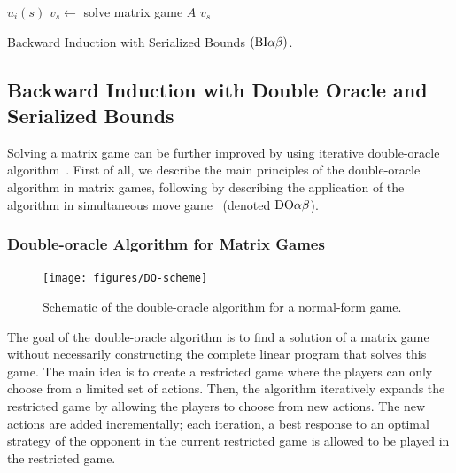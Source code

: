 \begin{algorithm2e}[t]
\small
{}
 {\Return $u_i(s)$} \label{alg:biab:stop1}
$v_s \leftarrow$ solve matrix game $A$\;
\Return $v_s$ \label{alg:biab:stop2}
\caption{Backward Induction with Serialized Bounds $(\textrm{BI}\alpha\beta)$.}\label{alg:backwardinduction-ab}
\end{algorithm2e}

\subsection{Backward Induction with Double Oracle and Serialized Bounds}\label{sec:algs:doab}

Solving a matrix game can be further improved by using iterative double-oracle algorithm~\cite{McMahan03Planning}. 
First of all, we describe the main principles of the double-oracle algorithm in matrix games, following by describing the application of the algorithm in simultaneous move game~\cite{Bosansky13Using} (denoted $\textrm{DO}\alpha\beta$).

\subsubsection{Double-oracle Algorithm for Matrix Games}\label{sec:doab}
\begin{figure}[t!]
\centering
\texttt{[image: figures/DO-scheme]}
\caption{Schematic of the double-oracle algorithm for a normal-form game.}\label{fig:do-scheme}
\end{figure}

The goal of the double-oracle algorithm is to find a solution of a matrix game without necessarily constructing the complete linear program that solves this game. 
The main idea is to create a restricted game where the players can only choose from a limited set of actions.
Then, the algorithm iteratively expands the restricted game by allowing the players to choose from new actions.
The new actions are added incrementally; each iteration, a best response to an optimal strategy of the opponent in the current restricted game is 
allowed to be played in the restricted game.


